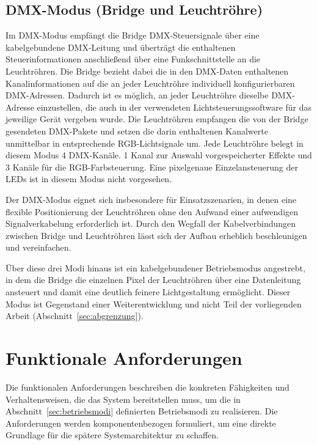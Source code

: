 \subsection{DMX-Modus (Bridge und Leuchtröhre)}
\label{subsec:dmx-modus}

Im DMX-Modus empfängt die Bridge DMX-Steuersignale über eine
kabelgebundene DMX-Leitung und überträgt die enthaltenen Steuerinformationen
anschließend über eine Funkschnittstelle an die Leuchtröhren. Die Bridge
bezieht dabei die in den DMX-Daten enthaltenen Kanalinformationen auf die an
jeder Leuchtröhre individuell konfigurierbaren DMX-Adressen. Dadurch ist es
möglich, an jeder Leuchtröhre dieselbe DMX-Adresse einzustellen, die auch in
der verwendeten Lichtsteuerungssoftware für das jeweilige Gerät vergeben wurde.
Die Leuchtröhren empfangen die von der Bridge gesendeten DMX-Pakete und setzen die
darin enthaltenen Kanalwerte unmittelbar in entsprechende RGB-Lichtsignale um.
Jede Leuchtröhre belegt in diesem Modus 4 DMX-Kanäle. 1 Kanal zur Auswahl 
vorgespeicherter Effekte und 3 Kanäle für die RGB-Farbsteuerung. 
Eine pixelgenaue Einzelansteuerung der LEDs ist in diesem Modus nicht
vorgesehen.

Der DMX-Modus eignet sich insbesondere für Einsatzszenarien, 
in denen eine flexible Positionierung der Leuchtröhren ohne den Aufwand einer 
aufwendigen Signalverkabelung erforderlich ist. Durch den Wegfall der 
Kabelverbindungen zwischen Bridge und Leuchtröhren lässt sich der Aufbau 
erheblich beschleunigen und vereinfachen.

Über diese drei Modi hinaus ist ein kabelgebundener Betriebsmodus angestrebt, in dem
die Bridge die einzelnen Pixel der Leuchtröhren über eine Datenleitung ansteuert und
damit eine deutlich feinere Lichtgestaltung ermöglicht. Dieser Modus ist Gegenstand
einer Weiterentwicklung und nicht Teil der vorliegenden Arbeit
(Abschnitt~\ref{sec:abgrenzung}).

\section{Funktionale Anforderungen}
\label{sec:funktionale-anforderungen}

Die funktionalen Anforderungen beschreiben die konkreten Fähigkeiten und
Verhaltensweisen, die das System bereitstellen muss, um die in
Abschnitt~\ref{sec:betriebsmodi} definierten Betriebsmodi zu realisieren.
Die Anforderungen werden komponentenbezogen formuliert, um eine direkte
Grundlage für die spätere Systemarchitektur zu schaffen.

